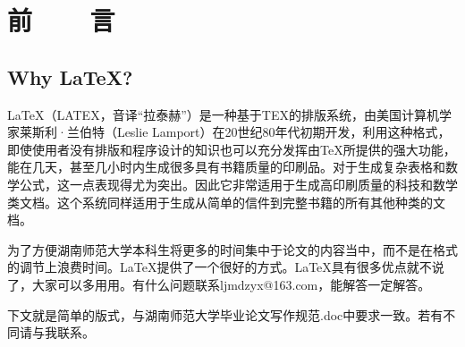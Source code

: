 \chapter{前~~~~言}
\section{Why \LaTeX ? }
\LaTeX（LATEX，音译“拉泰赫”）是一种基于TEX的排版系统，由美国计算机学家莱斯利·兰伯特（Leslie Lamport）在20世纪80年代初期开发，利用这种格式，即使使用者没有排版和程序设计的知识也可以充分发挥由\TeX{}所提供的强大功能，能在几天，甚至几小时内生成很多具有书籍质量的印刷品。对于生成复杂表格和数学公式，这一点表现得尤为突出。因此它非常适用于生成高印刷质量的科技和数学类文档。这个系统同样适用于生成从简单的信件到完整书籍的所有其他种类的文档。

为了方便湖南师范大学本科生将更多的时间集中于论文的内容当中，而不是在格式的调节上浪费时间。\LaTeX 提供了一个很好的方式。\LaTeX 具有很多优点就不说了，大家可以多用用。有什么问题联系ljmdzyx@163.com，能解答一定解答。
\par 下文就是简单的版式，与湖南师范大学毕业论文写作规范.doc中要求一致。若有不同请与我联系。


